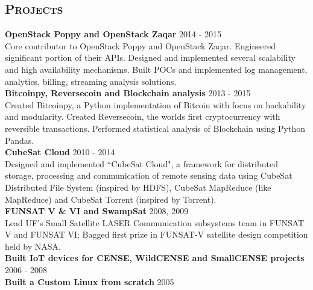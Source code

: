 \begin{resume}
\section{\textsc{Projects}}
\textbf{OpenStack Poppy and OpenStack Zaqar} \hfill 2014 - 2015\\
Core contributor to OpenStack Poppy and OpenStack Zaqar. Engineered significant portion of their APIs. Designed and implemented several scalability and high availability mechanisms. Built POCs and implemented log management, analytics, billing, streaming analysis solutions.\\
\textbf{Bitcoinpy, Reversecoin and Blockchain analysis} \hfill 2013 - 2015\\
Created Bitcoinpy, a Python implementation of Bitcoin with focus on hackability and modularity. Created Reversecoin, the worlds first cryptocurrency with reversible transactions. Performed statistical analysis of Blockchain using Python Pandas.\\
\textbf{CubeSat Cloud} \hfill 2010 - 2014 \\
Designed and implemented ``CubeSat Cloud", a framework for distributed storage, processing and communication of remote sensing data using CubeSat Distributed File System (inspired by HDFS), CubeSat MapReduce (like MapReduce) and CubeSat Torrent (inspired by Torrent).\\
\textbf{FUNSAT V \& VI and SwampSat} \hfill 2008, 2009 \\
Lead UF's Small Satellite LASER Communication subsystems team in FUNSAT V and FUNSAT VI; Bagged first prize in FUNSAT-V satellite design competition held by NASA.\\
\textbf{Built IoT devices for CENSE, WildCENSE and SmallCENSE projects} \hfill 2006 - 2008\\
\textbf{Built a Custom Linux from scratch} \hfill 2005







\end{resume}
